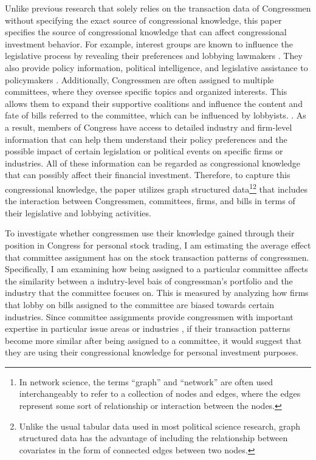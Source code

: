 \documentclass[15pt,letterpaper]{article}
\begin{document}
Unlike previous research that solely relies on the transaction data of Congressmen without specifying the exact source of congressional knowledge, 
this paper specifies the source of congressional knowledge that can affect congressional investment behavior.
For example,
interest groups are known to influence the legislative process by revealing their preferences and lobbying lawmakers \citep{smith}. 
They also provide policy information, political intelligence, and legislative assistance to policymakers \citep{hall_deardorff_2006}. 
Additionally, Congressmen are often assigned to multiple committees, where they oversee specific topics and organized interests. This allows them to expand their supportive coalitions and influence the content and fate of bills referred to the committee, which can be influenced by lobbyists. \citep{Hojnacki1998OrganizedIA}. 
As a result, members of Congress have access to detailed industry and firm-level information that can help them understand their policy preferences and the possible impact of certain legislation or political events on specific firms or industries.
All of these information can be regarded as congressional knowledge that can possibly affect their financial investment.
Therefore, to capture this congressional knowledge, the paper utilizes graph structured data\footnote{In network science, the terms ``graph'' and ``network'' are often used interchangeably to refer to a collection of nodes and edges, where the edges represent some sort of relationship or interaction between the nodes.}\footnote{Unlike the usual tabular data used in most political science research, graph structured data has the advantage of including the relationship between covariates in the form of connected edges between two nodes.} that includes the interaction between Congressmen, committees, firms, and bills in terms of their legislative and lobbying activities. 

To investigate whether congressmen use their knowledge gained through their position in Congress for personal stock trading, I am estimating the average effect that committee assignment has on the stock transaction patterns of congressmen. Specifically, I am examining how being assigned to a particular committee affects the similarity between a indutry-level bais of congressman's portfolio and the industry that the committee focuses on. 
This is measured by analyzing how firms that lobby on bills assigned to the committee are biased towards certain industries. Since committee assignments provide congressmen with important expertise in particular issue areas or industries \citep{Asher1974CommitteesAT}, if their transaction patterns become more similar after being assigned to a committee, it would suggest that they are using their congressional knowledge for personal investment purposes.
\end{document}
